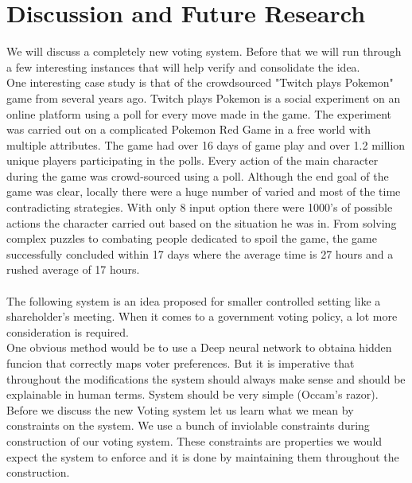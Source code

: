 \documentclass[a4paper]{article}
\begin{document}

\section{Discussion and Future Research}

We will discuss a completely new voting system. Before that we will run through a few interesting instances that will help verify and consolidate the idea.\\

 One interesting case study is that of the crowdsourced "Twitch plays Pokemon" game from several years ago. Twitch plays Pokemon is a social experiment on an online platform using a poll for every move made in the game. The experiment was carried out on a complicated Pokemon Red Game in a free world with multiple attributes. The game had over 16 days of game play and over 1.2 million unique players participating in the polls. Every action of the main character during the game was crowd-sourced using a poll. Although the end goal of the game was clear, locally there were a huge number of varied and most of the time contradicting strategies. With only 8 input option there were 1000's of possible actions the character carried out based on the situation he was in. From solving complex puzzles to combating people dedicated to spoil the game, the game successfully concluded within 17 days where the average time is 27 hours and a rushed average of 17 hours. \\ \\
The following system is an idea proposed for smaller controlled setting like a shareholder's meeting. When it comes to a government voting policy, a lot more consideration is required. \\

One obvious method would be to use a Deep neural network to obtaina  hidden funcion that correctly maps voter preferences. But it is imperative that throughout the modifications the system should always make sense and should be explainable in human terms. System should be very simple (Occam’s razor). \\

Before we discuss the new Voting system let us learn what we mean by constraints on the system. We use a bunch of inviolable constraints during construction of our voting system. These constraints are properties we would expect the system to enforce and it is done by maintaining them throughout the construction. \\ 
\end{document}
